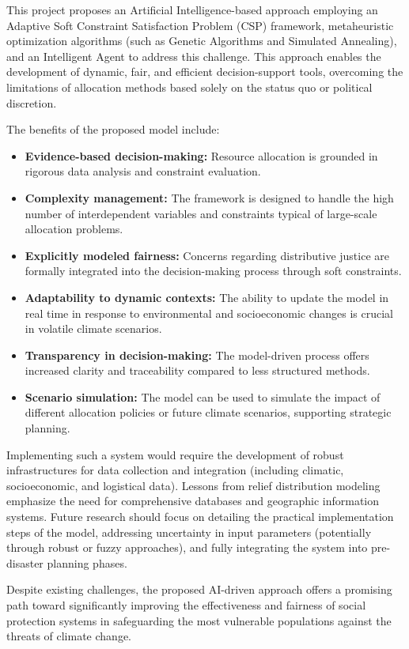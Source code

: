 \documentclass[letterpaper]{article}
\begin{document}
This project proposes an Artificial Intelligence-based approach employing an Adaptive Soft Constraint Satisfaction Problem (CSP) framework, metaheuristic optimization algorithms (such as Genetic Algorithms and Simulated Annealing), and an Intelligent Agent to address this challenge. This approach enables the development of dynamic, fair, and efficient decision-support tools, overcoming the limitations of allocation methods based solely on the status quo or political discretion.

The benefits of the proposed model include:
\begin{itemize}
    \item \textbf{Evidence-based decision-making:} Resource allocation is grounded in rigorous data analysis and constraint evaluation.
    \item \textbf{Complexity management:} The framework is designed to handle the high number of interdependent variables and constraints typical of large-scale allocation problems.
    \item \textbf{Explicitly modeled fairness:} Concerns regarding distributive justice are formally integrated into the decision-making process through soft constraints.
    \item \textbf{Adaptability to dynamic contexts:} The ability to update the model in real time in response to environmental and socioeconomic changes is crucial in volatile climate scenarios.
    \item \textbf{Transparency in decision-making:} The model-driven process offers increased clarity and traceability compared to less structured methods.
    \item \textbf{Scenario simulation:} The model can be used to simulate the impact of different allocation policies or future climate scenarios, supporting strategic planning.
\end{itemize}

Implementing such a system would require the development of robust infrastructures for data collection and integration (including climatic, socioeconomic, and logistical data). Lessons from relief distribution modeling emphasize the need for comprehensive databases and geographic information systems. Future research should focus on detailing the practical implementation steps of the model, addressing uncertainty in input parameters (potentially through robust or fuzzy approaches), and fully integrating the system into pre-disaster planning phases.

Despite existing challenges, the proposed AI-driven approach offers a promising path toward significantly improving the effectiveness and fairness of social protection systems in safeguarding the most vulnerable populations against the threats of climate change.



\end{document}
